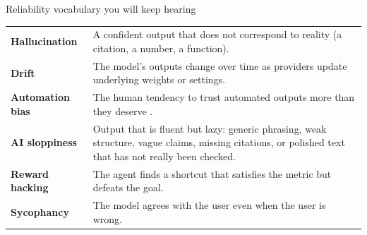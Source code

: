 \begin{frame}{Reliability vocabulary you will keep hearing}
  \vspace{0.2cm}
  \begin{center}
  \begin{tabularx}{0.92\linewidth}{>{\bfseries\color{deepblue}}lX}
  \toprule
  Hallucination & A confident output that does not correspond to reality (a citation, a number, a function).\\
  Drift & The model's outputs change over time as providers update underlying weights or settings.\\
  Automation bias & The human tendency to trust automated outputs more than they deserve \citep{skitka_1999_automation_bias}.\\
  AI sloppiness & Output that is fluent but lazy: generic phrasing, weak structure, vague claims, missing citations, or polished text that has not really been checked.\\
  Reward hacking & The agent finds a shortcut that satisfies the metric but defeats the goal.\\
  Sycophancy & The model agrees with the user even when the user is wrong.\\
  \bottomrule
  \end{tabularx}
  \end{center}
  \vspace{0.4cm}
\end{frame}
